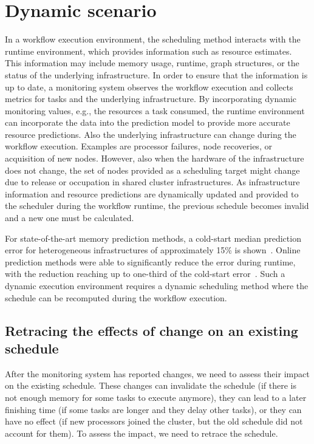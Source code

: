 \documentclass[conference]{IEEEtran}
\begin{document}
\section{Dynamic scenario}
\label{sec:dyn}


    In a workflow execution environment, the scheduling method interacts with the runtime environment, which provides information such as resource estimates.
    This information may include memory usage, runtime, graph structures, or the status of the underlying infrastructure.
    In order to ensure that the information is up to date, a monitoring system observes the workflow execution and collects metrics for tasks and the underlying infrastructure.
    By incorporating dynamic monitoring values, e.g., the resources a task consumed, the runtime environment can incorporate the data into the prediction model to provide more accurate resource predictions.
    Also the underlying infrastructure can change during the workflow execution.
    Examples are processor failures, node recoveries, or acquisition of new nodes.
    However, also when the hardware of the infrastructure does not change, the set of nodes provided as a scheduling target might change due to release or occupation in shared cluster infrastructures.
    As infrastructure information and resource predictions are dynamically updated and provided to the scheduler during the workflow runtime, the previous schedule becomes invalid and a new one must be calculated.

    For state-of-the-art memory prediction methods, a cold-start median prediction error for heterogeneous infrastructures
    of approximately 15\% is shown~\cite{malik2013execution}.
    Online prediction methods were able to significantly reduce the error during runtime, with the reduction reaching up to one-third of the cold-start error~\cite{baderDiedrichDynamic2023,witt2019learning}.
    Such a dynamic execution environment requires a dynamic scheduling method where the schedule can be recomputed during the workflow execution.

    \subsection*{Retracing the effects of change on an existing schedule}
    After the monitoring system has reported changes, we need to assess their impact on the existing schedule.
    These changes can invalidate the schedule (\eg if there is not enough memory for some tasks to execute anymore),
    they can lead to a later finishing time (\eg if some tasks are longer and they delay other tasks), or they can have no effect (\eg if new processors
    joined the cluster, but the old schedule did not account for them).
    To assess the impact, we need to retrace the schedule.
\end{document}
